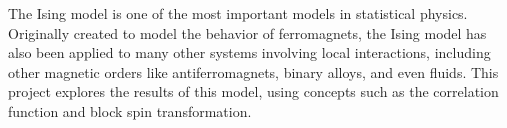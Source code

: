 The Ising model is one of the most important models in statistical physics. Originally created to model the behavior of ferromagnets, the Ising model has also been applied to many other systems involving local interactions, including other magnetic orders like antiferromagnets, binary alloys, and even fluids. This project explores the results of this model, using concepts such as the correlation function and block spin transformation.